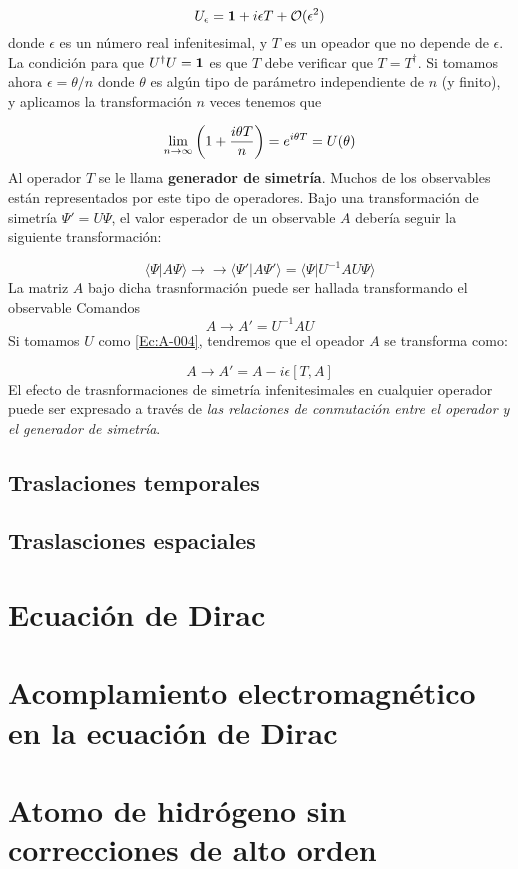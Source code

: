 \begin{equation}
    U_{\epsilon} = \mathbf{1} + i \epsilon T + \mathcal{O} (\epsilon^2) \label{Ec:A-004}
\end{equation}
donde $\epsilon$ es un número real infenitesimal, y $T$ es un opeador que no depende de $\epsilon$. La condición para que $U^{\dagger} U = \mathbf{1}$ es que $T$ debe  verificar que $T=T^{\dagger}$. Si tomamos ahora $\epsilon=\theta/n$ donde $\theta$ es algún tipo de parámetro independiente de $n$ (y finito), y aplicamos la transformación $n$ veces tenemos que

\begin{equation}
    \lim_{n\rightarrow \infty} \left( 1+ \frac{i\theta T}{n} \right) = e^{i \theta T} = U(\theta)
\end{equation}
Al operador $T$ se le llama {\bf generador de simetría}. Muchos de los observables están representados por este tipo de operadores. Bajo una transformación de simetría $\Psi'=U\Psi$, el valor esperador de un observable $A$ debería seguir la siguiente transformación:\

\begin{equation}
    \langle \Psi | A \Psi \rangle \rightarrow \rightarrow \langle \Psi' | A\Psi'\rangle = \langle \Psi | U^{-1} A U \Psi\rangle
\end{equation}
La matriz $A$ bajo dicha trasnformación puede ser hallada transformando el observable Comandos
\begin{equation}
    A \rightarrow A ' = U^{-1} A U
\end{equation}
Si tomamos $U$ como \ref{Ec:A-004}, tendremos que el opeador  $A$ se transforma como:

\begin{equation}
    A \rightarrow A' = A - i \epsilon [T,A]
\end{equation}
El efecto de trasnformaciones de simetría infenitesimales en cualquier operador puede ser expresado a través de {\it las relaciones de conmutación entre el operador y el generador de simetría}.



\subsection{Traslaciones temporales}

\subsection{Traslasciones espaciales}


\section{Ecuación de Dirac}

\section{Acomplamiento electromagnético en la ecuación de Dirac}

\section{Atomo de hidrógeno sin correcciones de alto orden}
